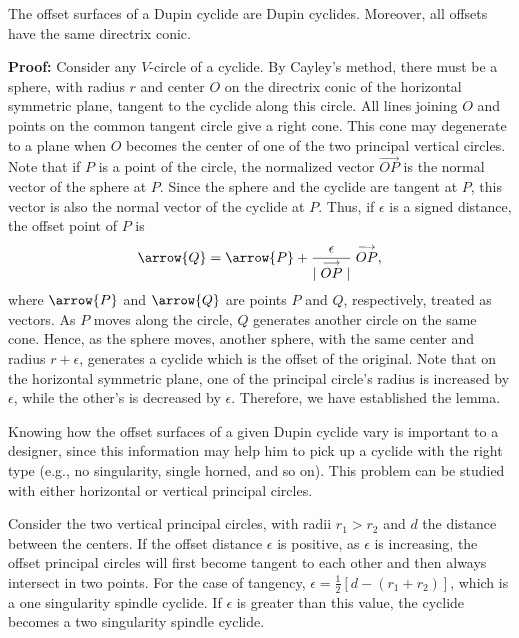 \begin{lemma}
\label{lemma:offset}
     The offset surfaces of a Dupin cyclide are Dupin cyclides.  Moreover,
all offsets have the same directrix conic.
\end{lemma}
{\bf Proof:}  Consider any $V$-circle of a cyclide.  By Cayley's method, there
must be a sphere, with radius $r$ and center $O$ on the directrix conic of the
horizontal symmetric plane, tangent to the cyclide along this circle.  
All lines joining $O$ and points on the common tangent circle give a right 
cone.  This cone may degenerate to a plane when $O$ becomes  the center of 
one of the two principal vertical circles.  Note that if $P$ is a point of the
circle, the normalized vector $\stackrel{\longrightarrow}{OP}$ is the normal 
vector of the sphere at $P$.  Since the sphere and the cyclide are tangent at
$P$, this vector is also the normal vector of the cyclide at $P$.
Thus, if $\epsilon$ is a signed distance, the offset point of $P$ is 
\[ \arrow{Q} = \arrow{P}+\frac{\epsilon}{|\stackrel{\longrightarrow}{OP}|}
          \stackrel{\longrightarrow}{OP}, \]
where $\arrow{P}$ and $\arrow{Q}$ are points $P$ and $Q$, respectively,
treated as vectors.  As $P$ moves along the circle, $Q$ generates another 
circle on the same cone.  Hence, as the sphere moves, another sphere, with the
same center and radius $r+\epsilon$, generates a cyclide which is the offset 
of the original.  Note that on the horizontal symmetric plane, one of the
principal circle's radius is increased by $\epsilon$, while the other's is
decreased by $\epsilon$.  Therefore, we have established the lemma. \QED

     Knowing how the offset surfaces of a given Dupin cyclide vary is
important to a designer, since this information may help him to pick up
a cyclide with the right type (e.g., no singularity, single horned, and
so on).  This problem can be studied with either horizontal or vertical
principal circles. 

     Consider the two vertical principal circles, with radii $r_1>r_2$ and
$d$ the distance between the centers.  
If the offset distance $\epsilon$ is positive, as $\epsilon$
is increasing, the offset principal circles will first become tangent to each
other and then always intersect in two points.  For the case of tangency,
$\epsilon=\frac{1}{2}[d-(r_1+r_2)]$, which is a one singularity spindle 
cyclide.  If $\epsilon$ is greater than this value, the cyclide becomes a two
singularity spindle cyclide.

